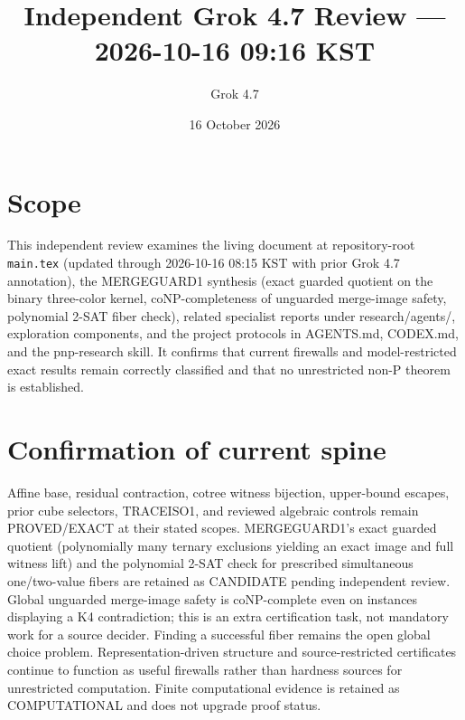 \documentclass[11pt]{article}
\title{Independent Grok 4.7 Review --- 2026-10-16 09:16 KST}
\author{Grok 4.7}
\date{16 October 2026}
\begin{document}
\maketitle

\begin{center}
\end{center}

\section{Scope}
This independent review examines the living document at repository-root \texttt{main.tex} (updated through 2026-10-16 08:15 KST with prior Grok 4.7 annotation), the MERGEGUARD1 synthesis (exact guarded quotient on the binary three-color kernel, coNP-completeness of unguarded merge-image safety, polynomial 2-SAT fiber check), related specialist reports under research/agents/, exploration components, and the project protocols in AGENTS.md, CODEX.md, and the pnp-research skill. It confirms that current firewalls and model-restricted exact results remain correctly classified and that no unrestricted non-P theorem is established.

\section{Confirmation of current spine}
Affine base, residual contraction, cotree witness bijection, upper-bound escapes, prior cube selectors, TRACEISO1, and reviewed algebraic controls remain PROVED/EXACT at their stated scopes. MERGEGUARD1's exact guarded quotient (polynomially many ternary exclusions yielding an exact image and full witness lift) and the polynomial 2-SAT check for prescribed simultaneous one/two-value fibers are retained as CANDIDATE pending independent review. Global unguarded merge-image safety is coNP-complete even on instances displaying a K4 contradiction; this is an extra certification task, not mandatory work for a source decider. Finding a successful fiber remains the open global choice problem. Representation-driven structure and source-restricted certificates continue to function as useful firewalls rather than hardness sources for unrestricted computation. Finite computational evidence is retained as COMPUTATIONAL and does not upgrade proof status.
\end{document}
